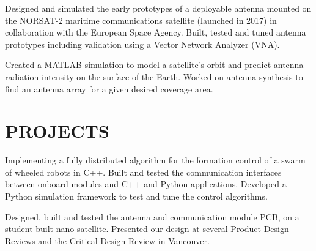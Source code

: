 \documentclass{ResumeTemplate}
\begin{document}
    \workitemstwo
    {Designed and simulated the early prototypes of a deployable antenna mounted on the NORSAT-2 maritime communications satellite (launched in 2017) in collaboration with the European Space Agency.}
    {Built, tested and tuned antenna prototypes including validation using a Vector Network Analyzer (VNA).}
    
    
    \workitemsone
    {Created a MATLAB simulation to model a satellite's orbit and predict antenna radiation intensity on the surface of the Earth. Worked on antenna synthesis to find an antenna array for a given desired coverage area.}
    
    \section{PROJECTS} %
    

    \workitemsthree
    {Implementing a fully distributed algorithm for the formation control of a swarm of wheeled robots in C++.}
    {Built and tested the communication interfaces between onboard modules and C++ and Python applications.}
    {Developed a Python simulation framework to test and tune the control algorithms. }
    

    

    \workitemstwo
    {Designed, built and tested the antenna and communication module PCB, on a student-built nano-satellite.}
    {Presented our design at several Product Design Reviews and the Critical Design Review in Vancouver.}
\end{document}
